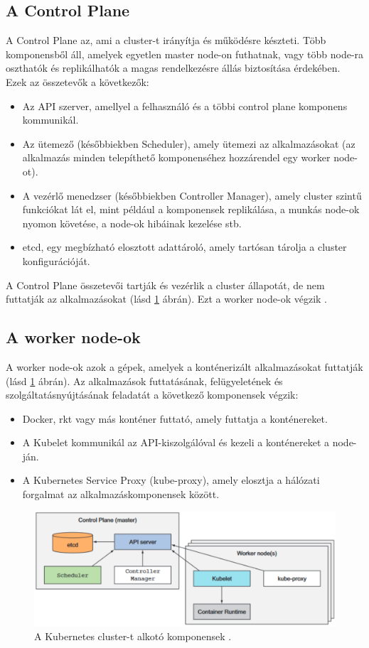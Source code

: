 \subsection{A Control Plane}
A Control Plane az, ami a cluster-t irányítja és működésre készteti.
Több komponensből áll, amelyek egyetlen master node-on futhatnak, vagy több node-ra oszthatók és replikálhatók a magas rendelkezésre állás biztosítása érdekében.
Ezek az összetevők a következők:
\begin{itemize}
    \item Az API szerver, amellyel a felhasználó és a többi control plane komponens kommunikál.
    \item Az ütemező (későbbiekben Scheduler), amely ütemezi az alkalmazásokat (az alkalmazás minden telepíthető komponenséhez hozzárendel egy worker node-ot).
    \item A vezérlő menedzser (későbbiekben Controller Manager), amely cluster szintű funkciókat lát el, mint például a komponensek replikálása, a munkás node-ok nyomon követése, a node-ok hibáinak kezelése stb.
    \item etcd, egy megbízható elosztott adattároló, amely tartósan tárolja a cluster konfigurációját.
\end{itemize}
A Control Plane összetevői tartják és vezérlik a cluster állapotát, de nem futtatják az alkalmazásokat (lásd \ref{cluster-overview} ábrán). Ezt a worker node-ok végzik \cite{Marko17}.

\subsection{A worker node-ok}
A worker node-ok azok a gépek, amelyek a konténerizált alkalmazásokat futtatják (lásd \ref{cluster-overview} ábrán).
Az alkalmazások futtatásának, felügyeletének és szolgáltatásnyújtásának feladatát a következő komponensek végzik: \cite{Marko17}
\begin{itemize}
    \item Docker, rkt vagy más konténer futtató, amely futtatja a konténereket.
    \item A Kubelet kommunikál az API-kiszolgálóval és kezeli a konténereket a node-ján.
    \item A Kubernetes Service Proxy (kube-proxy), amely elosztja a hálózati forgalmat az alkalmazáskomponensek között.
\end{itemize}

\begin{figure}[ht]
    \centering
         \includegraphics[width=1.0\textwidth]{figures/kubernetes/cluster-overview.png}
          \caption{A Kubernetes cluster-t alkotó komponensek \cite{Marko17}.}
           \label{cluster-overview}
\end{figure}

